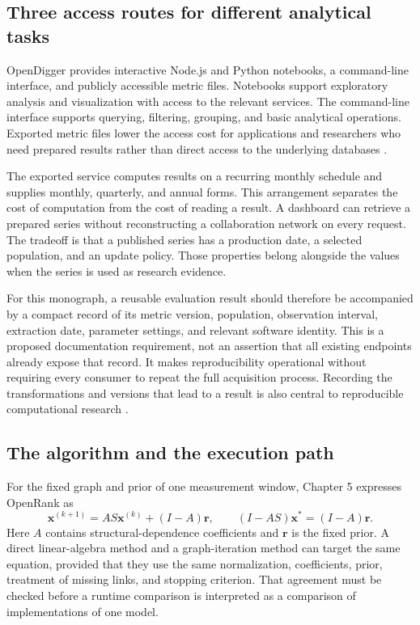 \subsection{Three access routes for different analytical tasks}
OpenDigger provides interactive Node.js and Python notebooks, a command-line interface, and publicly accessible metric files. Notebooks support exploratory analysis and visualization with access to the relevant services. The command-line interface supports querying, filtering, grouping, and basic analytical operations. Exported metric files lower the access cost for applications and researchers who need prepared results rather than direct access to the underlying databases \citep[Appendix A.5]{wang2026digger}.

The exported service computes results on a recurring monthly schedule and supplies monthly, quarterly, and annual forms. This arrangement separates the cost of computation from the cost of reading a result. A dashboard can retrieve a prepared series without reconstructing a collaboration network on every request. The tradeoff is that a published series has a production date, a selected population, and an update policy. Those properties belong alongside the values when the series is used as research evidence.

For this monograph, a reusable evaluation result should therefore be accompanied by a compact record of its metric version, population, observation interval, extraction date, parameter settings, and relevant software identity. This is a proposed documentation requirement, not an assertion that all existing endpoints already expose that record. It makes reproducibility operational without requiring every consumer to repeat the full acquisition process. Recording the transformations and versions that lead to a result is also central to reproducible computational research \citep{sandve2013}.

\subsection{The algorithm and the execution path}
For the fixed graph and prior of one measurement window, Chapter 5 expresses OpenRank as
\begin{equation}
 \boldsymbol x^{(k+1)}=AS\boldsymbol x^{(k)}+(I-A)\boldsymbol r,
 \qquad
 (I-AS)\boldsymbol x^*=(I-A)\boldsymbol r.
 \label{eq:ch6-computation}
\end{equation}
Here \(A\) contains structural-dependence coefficients and \(\boldsymbol r\) is the fixed prior. A direct linear-algebra method and a graph-iteration method can target the same equation, provided that they use the same normalization, coefficients, prior, treatment of missing links, and stopping criterion. That agreement must be checked before a runtime comparison is interpreted as a comparison of implementations of one model.

